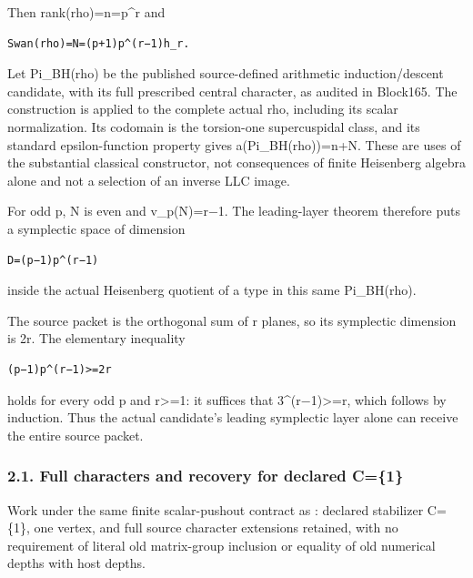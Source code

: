 Then rank(rho)=n=p\^{}r and

\begin{Verbatim}[fontsize=\small,breaklines=true,breakanywhere=true]
Swan(rho)=N=(p+1)p^(r−1)h_r.
\end{Verbatim}

Let Pi\_BH(rho) be the published source-defined arithmetic
induction/descent candidate, with its full prescribed central character,
as audited in Block165. The construction is applied to the complete
actual rho, including its scalar normalization. Its codomain is the
torsion-one supercuspidal class, and its standard epsilon-function
property gives a(Pi\_BH(rho))=n+N. These are uses of the substantial
classical constructor, not consequences of finite Heisenberg algebra
alone and not a selection of an inverse LLC image.

For odd p, N is even and v\_p(N)=r−1. The leading-layer theorem
therefore puts a symplectic space of dimension

\begin{Verbatim}[fontsize=\small,breaklines=true,breakanywhere=true]
D=(p−1)p^(r−1)
\end{Verbatim}

inside the actual Heisenberg quotient of a type in this same
Pi\_BH(rho).

The source packet is the orthogonal sum of r planes, so its symplectic
dimension is 2r. The elementary inequality

\begin{Verbatim}[fontsize=\small,breaklines=true,breakanywhere=true]
(p−1)p^(r−1)>=2r
\end{Verbatim}

holds for every odd p and r\textgreater=1: it suffices that
3\^{}(r−1)\textgreater=r, which follows by induction. Thus the actual
candidate's leading symplectic layer alone can receive the entire source
packet.

\hypertarget{odd_capacity-full-characters-and-recovery-for-declared-c1}{%
\subsubsection{2.1. Full characters and recovery for declared
C=\{1\}}\label{odd_capacity-full-characters-and-recovery-for-declared-c1}}

Work under the same finite scalar-pushout contract as
: declared stabilizer C=\{1\}, one
vertex, and full source character extensions retained, with no
requirement of literal old matrix-group inclusion or equality of old
numerical depths with host depths.

